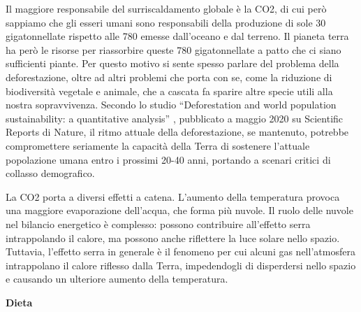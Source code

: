 \documentclass[12pt]{book} %
\begin{document}
Il maggiore responsabile del surriscaldamento globale è la CO2, di cui però sappiamo che gli esseri umani sono responsabili della
produzione di sole 30 gigatonnellate rispetto alle 780 emesse dall'oceano e dal
terreno. Il pianeta terra ha però le risorse per riassorbire queste 780 gigatonnellate a patto che ci siano sufficienti
piante. Per questo motivo si sente spesso parlare del problema della deforestazione, oltre ad altri problemi che porta
con se, come la riduzione di biodiversità vegetale e animale, che a cascata fa sparire altre specie utili alla nostra
sopravvivenza. Secondo lo studio “Deforestation and world population sustainability: a quantitative
analysis” , pubblicato a maggio 2020 su Scientific
Reports di Nature, il ritmo attuale della deforestazione, se mantenuto, potrebbe compromettere seriamente la capacità della Terra di sostenere l'attuale popolazione umana entro i prossimi 20-40 anni, portando a scenari critici di collasso demografico.

La CO2 porta a diversi effetti a catena. L'aumento della temperatura provoca una maggiore evaporazione dell'acqua, che forma più nuvole. Il ruolo delle nuvole nel bilancio energetico è complesso: possono contribuire all'effetto serra intrappolando il calore, ma possono anche riflettere la luce solare nello spazio. Tuttavia, l'effetto serra in generale è il fenomeno per cui alcuni gas nell'atmosfera intrappolano il calore riflesso dalla Terra, impedendogli di disperdersi nello spazio e causando un ulteriore aumento della temperatura.

\clearpage
\noindent \textbf{\large Dieta} \\
\end{document}
